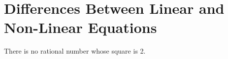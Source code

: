 \section{Differences Between Linear and Non-Linear Equations}
         
    \begin{theorem} 
        There is no rational number whose square is 2.
    \end{theorem}
    